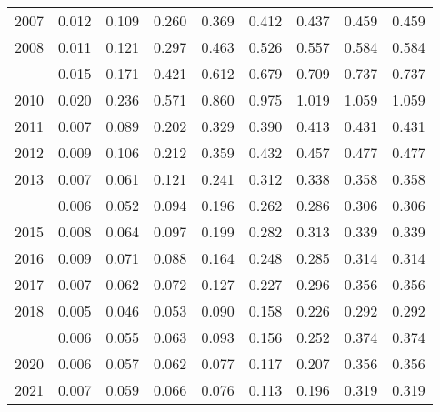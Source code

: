 \documentclass[
]{article}
\begin{document}
\begin{longtable}[t]{lrrrrrrrr}
2007 & 0.012 & 0.109 & 0.260 & 0.369 & 0.412 & 0.437 & 0.459 & 0.459\\
2008 & 0.011 & 0.121 & 0.297 & 0.463 & 0.526 & 0.557 & 0.584 & 0.584\\
\addlinespace
2009 & 0.015 & 0.171 & 0.421 & 0.612 & 0.679 & 0.709 & 0.737 & 0.737\\
2010 & 0.020 & 0.236 & 0.571 & 0.860 & 0.975 & 1.019 & 1.059 & 1.059\\
2011 & 0.007 & 0.089 & 0.202 & 0.329 & 0.390 & 0.413 & 0.431 & 0.431\\
2012 & 0.009 & 0.106 & 0.212 & 0.359 & 0.432 & 0.457 & 0.477 & 0.477\\
2013 & 0.007 & 0.061 & 0.121 & 0.241 & 0.312 & 0.338 & 0.358 & 0.358\\
\addlinespace
2014 & 0.006 & 0.052 & 0.094 & 0.196 & 0.262 & 0.286 & 0.306 & 0.306\\
2015 & 0.008 & 0.064 & 0.097 & 0.199 & 0.282 & 0.313 & 0.339 & 0.339\\
2016 & 0.009 & 0.071 & 0.088 & 0.164 & 0.248 & 0.285 & 0.314 & 0.314\\
2017 & 0.007 & 0.062 & 0.072 & 0.127 & 0.227 & 0.296 & 0.356 & 0.356\\
2018 & 0.005 & 0.046 & 0.053 & 0.090 & 0.158 & 0.226 & 0.292 & 0.292\\
\addlinespace
2019 & 0.006 & 0.055 & 0.063 & 0.093 & 0.156 & 0.252 & 0.374 & 0.374\\
2020 & 0.006 & 0.057 & 0.062 & 0.077 & 0.117 & 0.207 & 0.356 & 0.356\\
2021 & 0.007 & 0.059 & 0.066 & 0.076 & 0.113 & 0.196 & 0.319 & 0.319\\*
\end{longtable}
\end{document}
